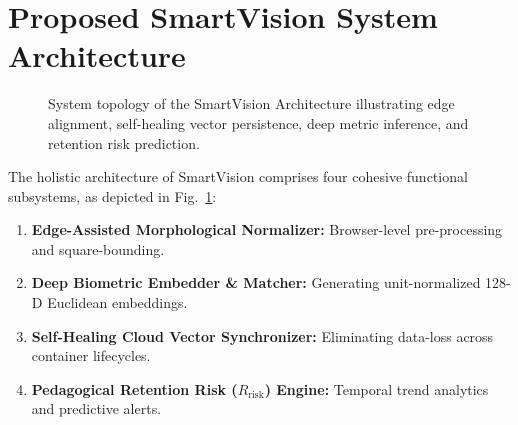 \documentclass[conference]{IEEEtran}
\begin{document}
\section{Proposed SmartVision System Architecture}

\begin{figure}[htbp]
\centering
{}
\caption{System topology of the SmartVision Architecture illustrating edge alignment, self-healing vector persistence, deep metric inference, and retention risk prediction.}
\label{fig:architecture}
\end{figure}

The holistic architecture of SmartVision comprises four cohesive functional subsystems, as depicted in Fig.~\ref{fig:architecture}:
\begin{enumerate}
    \item \textbf{Edge-Assisted Morphological Normalizer:} Browser-level pre-processing and square-bounding.
    \item \textbf{Deep Biometric Embedder \& Matcher:} Generating unit-normalized 128-D Euclidean embeddings.
    \item \textbf{Self-Healing Cloud Vector Synchronizer:} Eliminating data-loss across container lifecycles.
    \item \textbf{Pedagogical Retention Risk ($R_{\text{risk}}$) Engine:} Temporal trend analytics and predictive alerts.
\end{enumerate}
\end{document}
